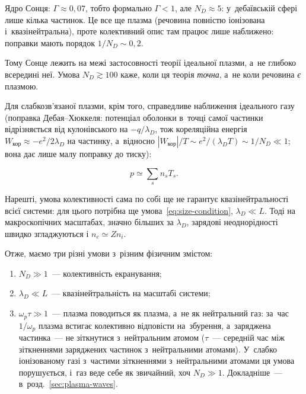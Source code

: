 \begin{Estimate}
Ядро Сонця: $\Gamma\approx0{,}07$, тобто формально $\Gamma<1$, але
$N_D\approx5$: у~дебаївській сфері лише кілька частинок. Це все ще плазма (речовина повністю
іонізована і~квазінейтральна), проте колективний опис там працює лише наближено:
поправки мають порядок $1/N_D\sim0{,}2$.
\end{Estimate}
Тому Сонце лежить на межі застосовності теорії
ідеальної плазми, а~не глибоко всередині неї. Умова $N_D\gtrsim100$ каже, коли ця теорія
\emph{точна}, а~не коли речовина \emph{є} плазмою.

Для слабкозв'язаної плазми, крім того, справедливе наближення ідеального газу (поправка Дебая--Хюккеля: потенціал оболонки в~точці самої частинки відрізняється від кулонівського на $-q/\lambda_D$, тож кореляційна енергія $W_{\text{кор}}\approx-e^2/2\lambda_D$ на частинку, а~відносно $|W_{\text{кор}}|/T\sim e^2/(\lambda_DT)\sim1/N_D\ll1$; вона дає лише малу поправку до тиску):

\begin{equation}\label{eq:ideal-pressure}
    p\simeq\sum_s n_s T_s.
\end{equation}

Нарешті, умова колективності сама по собі ще не гарантує квазінейтральності всієї системи:
для цього потрібна ще умова~\eqref{eq:size-condition}, $\lambda_D\ll L$. Тоді на макроскопічних
масштабах, значно більших за $\lambda_D$, зарядові неоднорідності швидко згладжуються і
$n_e\simeq Zn_i$.

Отже, маємо три різні умови з~різним фізичним змістом:
\begin{enumerate}
	\item $N_D\gg1$~--- колективність екранування;
	\item $\lambda_D\ll L$~--- квазінейтральність на масштабі системи;
	\item $\omega_p\tau\gg1$~--- плазма поводиться як плазма, а~не як нейтральний газ: за~час $1/\omega_p$ плазма
	  встигає колективно відповісти на~збурення, а~заряджена частинка~--- не зіткнутися з~нейтральним атомом ($\tau$~--- середній
	  час між зіткненнями заряджених частинок з~нейтральними атомами). У~слабко іонізованому газі з~частими
	  зіткненнями з~нейтральними атомами ця умова порушується, і~газ веде себе як звичайний, хоч $N_D\gg1$. Докладніше~---
	  в~розд.~\ref{sec:plasma-waves}.
\end{enumerate}

